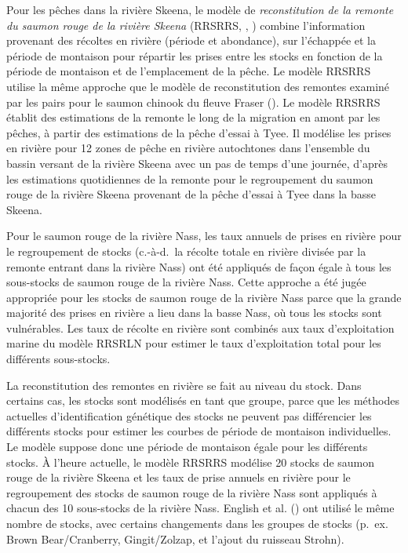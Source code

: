 \documentclass[french,11pt]{book}
\begin{document}
Pour les pêches dans la rivière Skeena, le modèle de \emph{reconstitution de la remonte du saumon rouge de la rivière Skeena} (RRSRRS, , ) combine l'information provenant des récoltes en rivière (période et abondance), sur l'échappée et la période de montaison pour répartir les prises entre les stocks en fonction de la période de montaison et de l'emplacement de la pêche. Le modèle RRSRRS utilise la même approche que le modèle de reconstitution des remontes examiné par les pairs pour le saumon chinook du fleuve Fraser (). Le modèle RRSRRS établit des estimations de la remonte le long de la migration en amont par les pêches, à partir des estimations de la pêche d'essai à Tyee. Il modélise les prises en rivière pour 12 zones de pêche en rivière autochtones dans l'ensemble du bassin versant de la rivière Skeena avec un pas de temps d'une journée, d'après les estimations quotidiennes de la remonte pour le regroupement du saumon rouge de la rivière Skeena provenant de la pêche d'essai à Tyee dans la basse Skeena.

Pour le saumon rouge de la rivière Nass, les taux annuels de prises en rivière pour le regroupement de stocks (c.-à-d.~la récolte totale en rivière divisée par la remonte entrant dans la rivière Nass) ont été appliqués de façon égale à tous les sous-stocks de saumon rouge de la rivière Nass. Cette approche a été jugée appropriée pour les stocks de saumon rouge de la rivière Nass parce que la grande majorité des prises en rivière a lieu dans la basse Nass, où tous les stocks sont vulnérables. Les taux de récolte en rivière sont combinés aux taux d'exploitation marine du modèle RRSRLN pour estimer le taux d'exploitation total pour les différents sous-stocks.

La reconstitution des remontes en rivière se fait au niveau du stock. Dans certains cas, les stocks sont modélisés en tant que groupe, parce que les méthodes actuelles d'identification génétique des stocks ne peuvent pas différencier les différents stocks pour estimer les courbes de période de montaison individuelles. Le modèle suppose donc une période de montaison égale pour les différents stocks. À l'heure actuelle, le modèle RRSRRS modélise 20 stocks de saumon rouge de la rivière Skeena et les taux de prise annuels en rivière pour le regroupement des stocks de saumon rouge de la rivière Nass sont appliqués à chacun des 10 sous-stocks de la rivière Nass. English et al. () ont utilisé le même nombre de stocks, avec certains changements dans les groupes de stocks (p.~ex. Brown Bear/Cranberry, Gingit/Zolzap, et l'ajout du ruisseau Strohn).
\end{document}
